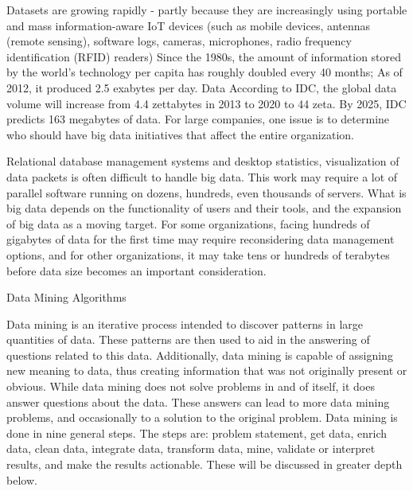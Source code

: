 Datasets are growing rapidly - partly because they are increasingly 
using portable and mass information-aware IoT devices (such as mobile
 devices, antennas (remote sensing), software logs, cameras, 
microphones, radio frequency identification (RFID) readers) Since 
the 1980s, the amount of information stored by the world's technology
 per capita has roughly doubled every 40 months; As of 2012, it 
produced 2.5 exabytes per day. Data According to IDC, the global 
data volume will increase from 4.4 zettabytes in 2013 to 2020 to 44 
zeta. By 2025, IDC predicts 163 megabytes of data. For large 
companies, one issue is to determine who should have big data 
initiatives that affect the entire organization\cite{editor03}.

Relational database management systems and desktop statistics, 
visualization of data packets is often difficult to handle big data. 
This work may require a lot of parallel software running on dozens, 
hundreds, even thousands of servers. What is big data depends on the 
functionality of users and their tools, and the expansion of big data
 as a moving target. For some organizations, facing hundreds of 
gigabytes of data for the first time may require reconsidering data 
management options, and for other organizations, it may take tens or 
hundreds of terabytes before data size becomes an important 
consideration\cite{editor03}.

Data Mining Algorithms

Data mining is an iterative process intended to discover patterns
in large quantities of data. These patterns are then used to aid 
in the answering of questions related to this data. Additionally,
data mining is capable of assigning new meaning to data, thus 
creating information that was not originally present or obvious. 
While data mining does not solve problems in and of itself, it 
does answer questions about the data. These answers can lead to 
more data mining problems, and occasionally to a solution to the 
original problem. Data mining is done in nine general steps. The 
steps are: problem statement, get data, enrich data, clean data, 
integrate data, transform data, mine, validate or interpret 
results, and make the results actionable. These will be discussed 
in greater depth below\cite{editor06}.

